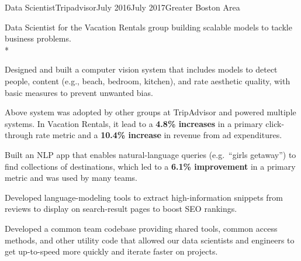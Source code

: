 \documentclass[print]{friggeri-cv} %
\begin{document}
\begin{job}
  {\tripicon}{Data Scientist}{Tripadvisor}{July 2016}{July 2017}{Greater Boston Area}{
    Data Scientist for the Vacation Rentals group building scalable models to tackle business problems.\\*
    \begin{myitemize}
      \item Designed and built a computer vision system that includes models to detect people, content (e.g.,
      beach, bedroom, kitchen), and rate aesthetic quality, with basic measures to prevent unwanted bias.

      \item Above system was adopted by other groups at TripAdvisor and powered multiple systems. In Vacation
      Rentals, it lead to a \textbf{4.8\% increases} in a primary click-through rate metric and a
      \textbf{10.4\% increase} in revenue from ad expenditures.

      \item Built an NLP app that enables natural-language queries (e.g.\ ``girls getaway'') to find
      collections of destinations, which led to a \textbf{6.1\% improvement} in a primary metric and was
      used by many teams.

      \item Developed language-modeling tools to extract high-information snippets from reviews to display on
      search-result pages to boost SEO rankings.

      \item Developed a common team codebase providing shared tools, common access methods, and other utility
      code that allowed our data scientists and engineers to get up-to-speed more quickly and iterate
      faster on projects.
    \end{myitemize}
  }
\end{job}
\end{document}
